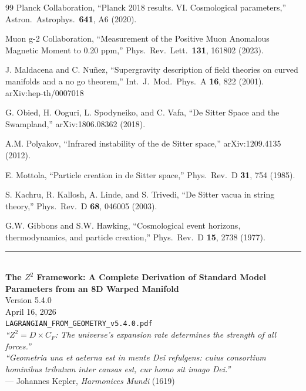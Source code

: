 \documentclass[11pt,a4paper]{article}
\theoremstyle{plain}
\theoremstyle{definition}
\theoremstyle{remark}
\begin{document}
\begin{thebibliography}{99}
 Planck Collaboration, ``Planck 2018 results. VI. Cosmological parameters,'' Astron.\ Astrophys.\ \textbf{641}, A6 (2020).

 Muon g-2 Collaboration, ``Measurement of the Positive Muon Anomalous Magnetic Moment to 0.20 ppm,'' Phys.\ Rev.\ Lett.\ \textbf{131}, 161802 (2023).

 J. Maldacena and C. Nu\~{n}ez, ``Supergravity description of field theories on curved manifolds and a no go theorem,'' Int.\ J.\ Mod.\ Phys.\ A \textbf{16}, 822 (2001). arXiv:hep-th/0007018

 G. Obied, H. Ooguri, L. Spodyneiko, and C. Vafa, ``De Sitter Space and the Swampland,'' arXiv:1806.08362 (2018).

 A.M. Polyakov, ``Infrared instability of the de Sitter space,'' arXiv:1209.4135 (2012).

 E. Mottola, ``Particle creation in de Sitter space,'' Phys.\ Rev.\ D \textbf{31}, 754 (1985).

 S. Kachru, R. Kallosh, A. Linde, and S. Trivedi, ``De Sitter vacua in string theory,'' Phys.\ Rev.\ D \textbf{68}, 046005 (2003).

 G.W. Gibbons and S.W. Hawking, ``Cosmological event horizons, thermodynamics, and particle creation,'' Phys.\ Rev.\ D \textbf{15}, 2738 (1977).

\end{thebibliography}

\vspace{2cm}
\begin{center}
\rule{0.8\textwidth}{0.5pt}\\[0.5cm]
\textbf{The $Z^2$ Framework: A Complete Derivation of Standard Model Parameters from an 8D Warped Manifold}\\[0.3cm]
Version 5.4.0\\
April 16, 2026\\[0.3cm]
\texttt{LAGRANGIAN\_FROM\_GEOMETRY\_v5.4.0.pdf}\\[0.5cm]
\emph{``$Z^2 = D \times C_F$: The universe's expansion rate determines the strength of all forces.''}\\[0.5cm]
\emph{``Geometria una et aeterna est in mente Dei refulgens: cuius consortium hominibus tributum inter causas est, cur homo sit imago Dei.''}\\
--- Johannes Kepler, \emph{Harmonices Mundi} (1619)
\end{center}
\end{document}

